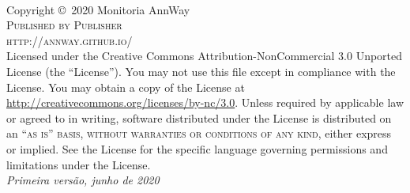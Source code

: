 \documentclass[11pt,fleqn]{book} %
\begin{document}

\begingroup
\thispagestyle{empty} %
\vfill
\endgroup


\newpage
~\vfill
\thispagestyle{empty}

\noindent Copyright \copyright\ 2020 Monitoria AnnWay\\ %

\noindent \textsc{Published by Publisher}\\ %

\noindent \textsc{http://annway.github.io/}\\ %

\noindent Licensed under the Creative Commons Attribution-NonCommercial 3.0 Unported License (the ``License''). You may not use this file except in compliance with the License. You may obtain a copy of the License at \url{http://creativecommons.org/licenses/by-nc/3.0}. Unless required by applicable law or agreed to in writing, software distributed under the License is distributed on an \textsc{``as is'' basis, without warranties or conditions of any kind}, either express or implied. See the License for the specific language governing permissions and limitations under the License.\\ %

\noindent \textit{Primeira versão, junho de 2020} %
\end{document}

